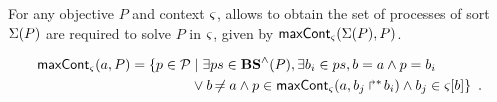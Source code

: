 \begin{comment}
\begin{definition}[$\uconcr: \powerset(\OS) \mapsto \powerset(\Sce)$]
\label{def:uconcr-set}
  $\uconcr(\Omega) = \{ \delta \in \uconcr(\w) \mid \w \in \Omega\}$
\end{definition}
\end{comment}

For any objective $P$ and context $\varsigma$,  allows to obtain the set of processes of sort $\Sigma(P)$ are required to solve $P$ in $\varsigma$, given by $\mathsf{maxCont}_\varsigma(\Sigma(P), P)$.
\begin{comment}
\begin{definition}
\label{def:allprocs}
  \begin{align*}
  \allprocs(\V, \E) = \{ p \in \PHproc &\mid p \in \V \vee \exists P \in \V \cap \Obj,\\
  &\qquad p = \PHtarget(P) \vee p = \PHbounce(P) \}
  \end{align*}
  \begin{align*}
  \allprocs(\V, \E) = (V \cap \Proc) \cup \{ \PHtarget(P), \PHbounce(P) \mid P \in \V \cap \Obj \}
  \end{align*}
\end{definition}
\end{comment}
%
\begin{comment}
\begin{definition} \todo{À revoir avec la nouvelle sémantique}
\label{def:allprocs}
  \begin{align*}
  &\allprocs((\cwSol,\cwReq,\cwRSP,\cwCont)) = \{ p \in \PHproc \mid \exists (P,ps) \in \cwSol, \\
    &\qquad\qquad p \in ps \vee p = \PHtarget(P) \vee p = \PHbounce(P) \\
    &\qquad\qquad \vee \exists (a_i,ps) \in \cwRSP, p \in ps \}
  \end{align*}
\end{definition}
\end{comment}
%
%
%
\begin{definition}[$\gCont_\ctx : \Sigma \times \Obj \rightarrow \powerset(\PHproc)$]
  \label{def:maxCont}
  \begin{align*}
    \mathsf{maxCont}_\varsigma(a,P) = 
    \{ p \in \mathcal{P} &\mid \exists ps \in \mathbf{BS}^\wedge(P), \exists b_i \in ps, b = a \wedge p = b_i \\
      & \vee b \not\nobreak\mkern -2mu = a \wedge p \in \mathsf{maxCont}_\varsigma(a, \mbox{$b_j\Rsh^*\!b_i$}) \wedge b_j \in {\varsigma[b]} \}
    \enspace.
  \end{align*}
\end{definition}

